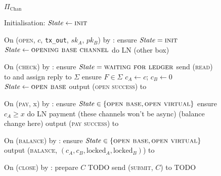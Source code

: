 \begin{figure}[H]
  \begin{protocolbox}{$\Pi_{\mathrm{Chan}}$}
    \begin{algorithmic}[1]
      \State Initialisation:
      \Indent
        \State $\mathit{State} \gets \textsc{init}$
      \EndIndent
      \Statex

      \State On (\textsc{open}, $c$, \texttt{tx\_out}, $sk_A$, $pk_B$) by
      \environment:
      \Indent
        \State ensure $\mathit{State} = \textsc{init}$
        \State $\mathit{State} \gets \textsc{opening base channel}$
        \State do LN (other box) %
      \EndIndent
      \Statex

      \State On (\textsc{check}) by \environment:
      \Indent
        \State ensure $\mathit{State} = \textsc{waiting for ledger}$
        \State send (\textsc{read}) to \ledger and assign reply to $\Sigma$
        \State ensure $F \in \Sigma$
        \State $c_A \gets c$; $c_B \gets 0$ 
        \State $\mathit{State} \gets \textsc{open base}$
        \State output (\textsc{open success}) to \environment
      \EndIndent
      \Statex

      \State On (\textsc{pay}, x) by \environment:
      \Indent
        \State ensure $\mathit{State} \in \{\textsc{open base}, \textsc{open
        virtual}\}$
        \State ensure $c_A \geq x$
        \State do LN payment (these channels won't be async) (balance change
        here) %
        \State output (\textsc{pay success}) to \environment
      \EndIndent
      \Statex

      \State On (\textsc{balance}) by \environment:
      \Indent
        \State ensure $\mathit{State} \in \{\textsc{open base}, \textsc{open
        virtual}\}$
        \State output (\textsc{balance}, $(c_A, c_B, \mathrm{locked}_A,
        \mathrm{locked}_B)$) to \environment %
      \EndIndent
      \Statex

      \State On (\textsc{close}) by \environment:
      \Indent
          \State prepare $C$ TODO
          \State send (\textsc{submit}, $C$) to \ledger
          \State TODO
        \EndIf
      \EndIndent
    \end{algorithmic}
  \end{protocolbox}
  \caption{}
  \label{code:protocol:chan:skeleton}
\end{figure}


